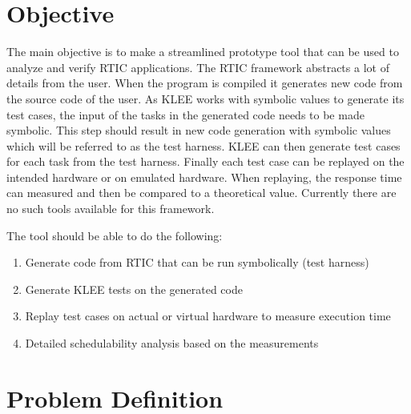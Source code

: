 %

\section{Objective}
The main objective is to make a streamlined prototype tool that can be used to
analyze and verify RTIC applications. The RTIC framework abstracts a lot of
details from the user. When the program is compiled it generates new code from
the source code of the user. As KLEE works with symbolic values to generate its
test cases, the input of the tasks in the generated code needs to be made
symbolic. This step should result in new code generation with symbolic values
which will be referred to as the test harness. KLEE can then generate test
cases for each task from the test harness. Finally each test case can be
replayed on the intended hardware or on emulated hardware. When replaying, the
response time can measured and then be compared to a theoretical value.
Currently there are no such tools available for this framework.

The tool should be able to do the following:
%
\begin{enumerate}
    \item Generate code from RTIC that can be run symbolically (test harness)
    \item Generate KLEE tests on the generated code
    \item Replay test cases on actual or virtual hardware to measure execution time
    \item Detailed schedulability analysis based on the measurements
\end{enumerate}

\section{Problem Definition}


